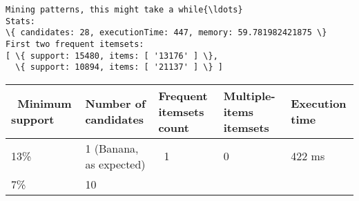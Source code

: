 \documentclass[11pt]{article}
\begin{document}
    \begin{Verbatim}[commandchars=\\\{\}]
Mining patterns, this might take a while{\ldots}
Stats:
\{ candidates: 28, executionTime: 447, memory: 59.781982421875 \}
First two frequent itemsets:
[ \{ support: 15480, items: [ '13176' ] \},
  \{ support: 10894, items: [ '21137' ] \} ]

    \end{Verbatim}

    \begin{longtable}[]{@{}lllll@{}}
\toprule
\begin{minipage}[b]{0.14\columnwidth}\raggedright
~Minimum support\strut
\end{minipage} & \begin{minipage}[b]{0.18\columnwidth}\raggedright
Number of candidates\strut
\end{minipage} & \begin{minipage}[b]{0.20\columnwidth}\raggedright
Frequent itemsets count\strut
\end{minipage} & \begin{minipage}[b]{0.20\columnwidth}\raggedright
Multiple-items itemsets\strut
\end{minipage} & \begin{minipage}[b]{0.13\columnwidth}\raggedright
Execution time\strut
\end{minipage}\tabularnewline
\midrule
\endhead
\begin{minipage}[t]{0.14\columnwidth}\raggedright
13\%\strut
\end{minipage} & \begin{minipage}[t]{0.18\columnwidth}\raggedright
1 (Banana, as expected)\strut
\end{minipage} & \begin{minipage}[t]{0.20\columnwidth}\raggedright
~1\strut
\end{minipage} & \begin{minipage}[t]{0.20\columnwidth}\raggedright
0\strut
\end{minipage} & \begin{minipage}[t]{0.13\columnwidth}\raggedright
422 ms\strut
\end{minipage}\tabularnewline
\begin{minipage}[t]{0.14\columnwidth}\raggedright
7\%\strut
\end{minipage} & \begin{minipage}[t]{0.18\columnwidth}\raggedright
10\strut
\end{minipage} & \begin{minipage}[t]{0.20\columnwidth}\raggedright

\end{minipage}
\end{longtable}
\end{document}
